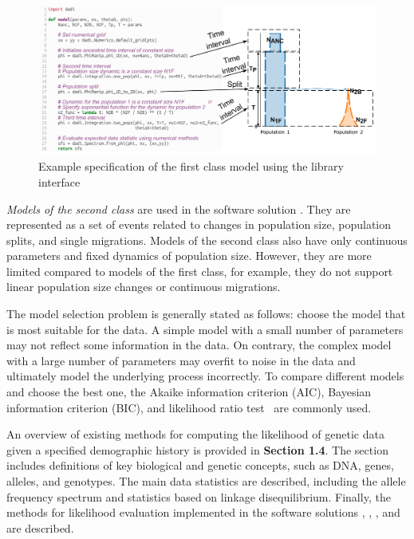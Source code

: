 \begin{figure}[b]
\centering
\includegraphics[width=\linewidth]{images_2/dadi_model_en.pdf}
\caption{Example specification of the first class model using the \dadi library interface}
\end{figure}

\textit{Models of the second class} are used in the software solution \momi.
They are represented as a set of events related to changes in population size, population splits, and single migrations.
Models of the second class also have only continuous parameters and fixed dynamics of population size.
However, they are more limited compared to models of the first class, for example, they do not support linear population size changes or continuous migrations.

The model selection problem is generally stated as follows: choose the model that is most suitable for the data.
A simple model with a small number of parameters may not reflect some information in the data.
On contrary, the complex model with a large number of parameters may overfit to noise in the data and ultimately model the underlying process incorrectly.
To compare different models and choose the best one, the Akaike information criterion (AIC)\cite{akaike1974new}, Bayesian information criterion (BIC)\cite{schwarz1978estimating}, and likelihood ratio test~\cite{vuong1989likelihood} are commonly used.

An overview of existing methods for computing the likelihood of genetic data given a specified demographic history is provided in \textbf{Section 1.4}.
The section includes definitions of key biological and genetic concepts, such as DNA, genes, alleles, and genotypes.
The main data statistics are described, including the allele frequency spectrum and statistics based on linkage disequilibrium.
Finally, the methods for likelihood evaluation implemented in the software solutions \dadi, \moments, \momi, and \momentsLD are described.

